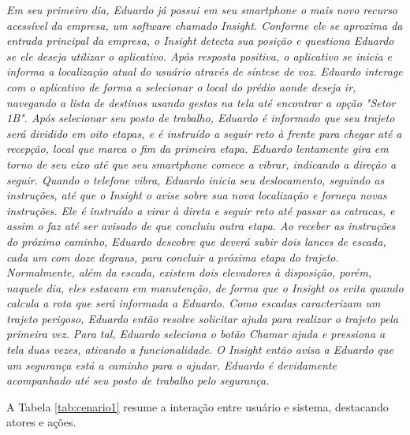 \documentclass[twoside,english,brazilian]{UNISINOSartigo}
\begin{document}
\textit{Em seu primeiro dia, Eduardo já possui em seu smartphone o mais novo recurso acessível da empresa, um software chamado Insight. Conforme ele se aproxima da entrada principal da empresa, o Insight detecta sua posição e questiona Eduardo se ele deseja utilizar o aplicativo. Após resposta positiva, o aplicativo se inicia e informa a localização atual do usuário através de síntese de voz. Eduardo interage com o aplicativo de forma a selecionar o local do prédio aonde deseja ir, navegando a lista de destinos usando gestos na tela até encontrar a opção "Setor 1B". Após selecionar seu posto de trabalho, Eduardo é informado que seu trajeto será dividido em oito etapas, e é instruído a seguir reto à frente para chegar até a recepção, local que marca o fim da primeira etapa. Eduardo lentamente gira em torno de seu eixo até que seu smartphone comece a vibrar, indicando a direção a seguir. Quando o telefone vibra, Eduardo inicia seu deslocamento, seguindo as instruções, até que o Insight o avise sobre sua nova localização e forneça novas instruções. Ele é instruído a virar à direta e seguir reto até passar as catracas, e assim o faz até ser avisado de que concluiu outra etapa. Ao receber as instruções do próximo caminho, Eduardo descobre que deverá subir dois lances de escada, cada um com doze degraus, para concluir a próxima etapa do trajeto. Normalmente, além da escada, existem dois elevadores à disposição, porém, naquele dia, eles estavam em manutenção, de forma que o Insight os evita quando calcula a rota que será informada a Eduardo. Como escadas caracterizam um trajeto perigoso, Eduardo então resolve solicitar ajuda para realizar o trajeto pela primeira vez. Para tal, Eduardo seleciona o botão Chamar ajuda e pressiona a tela duas vezes, ativando a funcionalidade. O Insight então avisa a Eduardo que um segurança está a caminho para o ajudar. Eduardo é devidamente acompanhado até seu posto de trabalho pelo segurança.}

A Tabela \ref{tab:cenario1} resume a interação entre usuário e sistema, destacando atores e ações.
\end{document}
